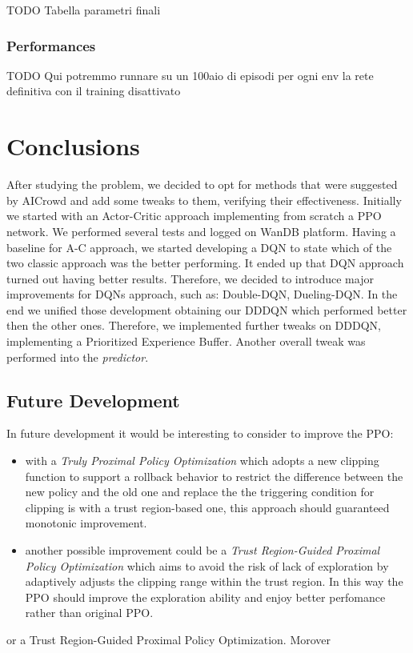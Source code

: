 \documentclass[12pt]{article}
\begin{document}
TODO Tabella parametri finali

\subsubsection{Performances}

TODO Qui potremmo runnare su un 100aio di episodi per ogni env la rete definitiva con il training disattivato

\newpage
\section{Conclusions}
After studying the problem, we decided to opt for methods that were suggested by AICrowd and add some tweaks to them, verifying their effectiveness. Initially we started with an Actor-Critic approach implementing from scratch a PPO network. We performed several tests and logged on WanDB \cite{wandb} platform. Having a baseline for A-C approach, we started developing a DQN to state which of the two classic approach was the better performing. It ended up that DQN approach turned out having better results. Therefore, we decided to introduce major improvements for DQNs approach, such as: Double-DQN, Dueling-DQN. In the end we unified those development obtaining our DDDQN which performed better then the other ones. Therefore, we implemented further tweaks on DDDQN, implementing a Prioritized Experience Buffer. Another overall tweak was performed into the \textit{predictor}.




\subsection{Future Development}
In future development it would be interesting to consider to improve the PPO:
\begin{itemize}
    \item with a \textit{Truly Proximal Policy Optimization} \cite{truly-ppo} which adopts a new clipping function to support a rollback behavior to restrict the difference between the new policy and the old one and replace the the triggering condition for clipping is  with a trust region-based one, this approach should guaranteed monotonic improvement.
    
    \item another possible improvement could be a \textit{Trust Region-Guided Proximal Policy Optimization} \cite{trgppo} which aims to avoid the risk of lack of exploration by adaptively adjusts the clipping range within the trust region. In this way the PPO should improve the exploration ability and enjoy better perfomance rather than original PPO.
    
\end{itemize}
 or a Trust Region-Guided Proximal Policy Optimization. Morover 
\end{document}
